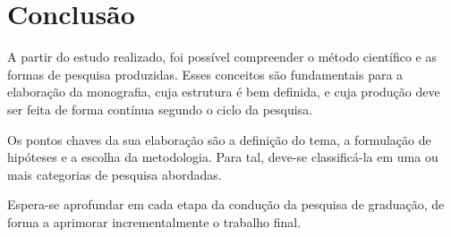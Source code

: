 \section{Conclusão}%
\label{sec:conclusao}

A partir do estudo realizado, foi possível compreender o método científico e as formas de pesquisa produzidas.
Esses conceitos são fundamentais para a elaboração da monografia, cuja estrutura é bem definida, e cuja produção deve ser feita de forma contínua segundo o ciclo da pesquisa.

Os pontos chaves da sua elaboração são a definição do tema, a formulação de hipóteses e a escolha da metodologia.
Para tal, deve-se classificá-la em uma ou mais categorias de pesquisa abordadas.

Espera-se aprofundar em cada etapa da condução da pesquisa de graduação, de forma a aprimorar incrementalmente o trabalho final.